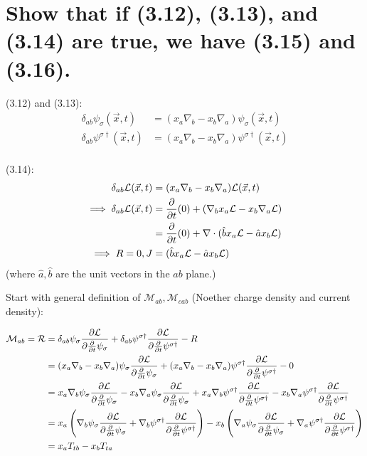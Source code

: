 \section{Show that if (3.12), (3.13), and (3.14) are true, we have (3.15) and (3.16).}

(3.12) and (3.13):
\begin{align*}
    \delta_{ab}\psi_\sigma(\vec{x}, t) &= (x_a \nabla_b - x_b \nabla_a)\psi_\sigma(\vec{x}, t) \\
    \delta_{ab}\psi^{\sigma\dagger}(\vec{x}, t) &= (x_a \nabla_b - x_b \nabla_a)\psi^{\sigma\dagger}(\vec{x}, t) \\
\end{align*}

(3.14):
\begin{align*}
    \delta_{ab} \mathcal{L}(\vec{x},t) &= (x_a \nabla_b - x_b \nabla_a) \mathcal{L}(\vec{x},t)\\
    \implies \delta_{ab} \mathcal{L}(\vec{x},t) &= \frac{\partial}{\partial t}(0) + (\nabla_b x_a \mathcal{L}  - x_b \nabla_a\mathcal{L} ) \\
    &= \frac{\partial}{\partial t}(0) + \nabla \cdot (\hat{b}x_a\mathcal{L} - \hat{a}x_b\mathcal{L}) \\
    \implies R = 0, J &= (\hat{b}x_a\mathcal{L} - \hat{a}x_b\mathcal{L}) \\
\end{align*}
(where $\hat{a}, \hat{b}$ are the unit vectors in the $ab$ plane.)

Start with general definition of $\mathcal{M}_{ab}, \mathcal{M}_{cab}$ (Noether charge density and current density):

\begin{align*}
    \mathcal{M}_{ab} = \mathcal{R} &= \delta_{ab}\psi_\sigma \frac{\partial \mathcal{L}}{\partial \frac{\partial}{\partial t}\psi_\sigma} + \delta_{ab}\psi^{\sigma\dagger} \frac{\partial \mathcal{L}}{\partial \frac{\partial}{\partial t}\psi^{\sigma\dagger}} - R \\
    &= (x_a\nabla_b - x_b\nabla_a)\psi_\sigma \frac{\partial \mathcal{L}}{\partial \frac{\partial}{\partial t}\psi_\sigma} + (x_a\nabla_b - x_b\nabla_a)\psi^{\sigma\dagger} \frac{\partial \mathcal{L}}{\partial \frac{\partial}{\partial t}\psi^{\sigma\dagger}} - 0 \\
    &= x_a\nabla_b \psi_\sigma \frac{\partial \mathcal{L}}{\partial \frac{\partial}{\partial t}\psi_\sigma} - x_b\nabla_a\psi_\sigma \frac{\partial \mathcal{L}}{\partial \frac{\partial}{\partial t}\psi_\sigma} + x_a\nabla_b\psi^{\sigma\dagger} \frac{\partial \mathcal{L}}{\partial \frac{\partial}{\partial t}\psi^{\sigma\dagger}} - x_b\nabla_a\psi^{\sigma\dagger} \frac{\partial \mathcal{L}}{\partial \frac{\partial}{\partial t}\psi^{\sigma\dagger}} \\
    &= x_a\left(\nabla_b \psi_\sigma \frac{\partial \mathcal{L}}{\partial \frac{\partial}{\partial t}\psi_\sigma} 
    + \nabla_b\psi^{\sigma\dagger} \frac{\partial \mathcal{L}}{\partial \frac{\partial}{\partial t}\psi^{\sigma\dagger}}\right)
    - x_b\left(\nabla_a\psi_\sigma \frac{\partial \mathcal{L}}{\partial \frac{\partial}{\partial t}\psi_\sigma}
    + \nabla_a\psi^{\sigma\dagger} \frac{\partial \mathcal{L}}{\partial \frac{\partial}{\partial t}\psi^{\sigma\dagger}}\right) \\
    &= x_aT_{tb} - x_bT_{ta} \\
\end{align*}

